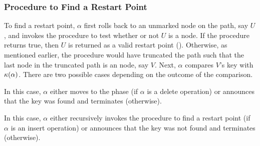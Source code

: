 \subsubsection{Procedure to Find a Restart Point}
\label{sec:find|restart|point}

To find a restart point, $\alpha$ first rolls back to an unmarked node on the path, say $U$, and invokes the procedure to test whether or not $U$ is a \mysafe{} node. If the procedure returns true, then $U$ is returned as a valid restart point ().
Otherwise, as mentioned earlier, the procedure would have truncated the path such that the last node in the truncated path is an \mynonconsistent{} node, say $V$. 
Next, $\alpha$ compares $V$'s key with $\kappa(\alpha)$. There are two possible cases depending on the outcome of the comparison.

 In this case, $\alpha$ either moves to the \action{} phase (if $\alpha$ is a delete operation) or announces that the key was found and terminates (otherwise).

 In this case, $\alpha$ either  recursively invokes the procedure to find a restart point (if $\alpha$ is an insert operation) or announces that the key was not found and terminates (otherwise).
